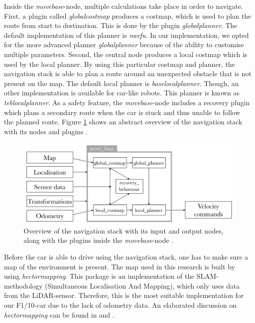 \documentclass[conference,a4paper]{IEEEtran}
\begin{document}
Inside the \textit{move\textunderscore base}-node, multiple calculations take place in order to navigate. First, a plugin called \emph{global\textunderscore costmap} produces a costmap, which is used to plan the route from start to destination. This is done by the plugin \emph{global\textunderscore planner}. The default implementation of this planner is \emph{navfn}. In our implementation, we opted for the more advanced planner \emph{global\textunderscore planner} because of the ability to customise multiple parameters. Second, the central node produces a local costmap which is used by the local planner. By using this particular costmap and planner, the navigation stack is able to plan a route around an unexpected obstacle that is not present on the map. The default local planner is \emph{base\textunderscore local\textunderscore planner}. Though, an other implementation is available for car-like robots. This planner is known as \emph{teb\textunderscore local\textunderscore planner}\cite{Rosmann2016}.  As a safety feature, the \emph{move\textunderscore base}-node includes a recovery plugin which plans a secondary route when the car is stuck and thus unable to follow the planned route.
Figure \ref{fig:navstack_global} shows an abstract overview of the navigation stack with its nodes and plugins \cite{Marder-Eppstein2016_2, Zheng2016}.
\begin{figure}[!t]
    \includegraphics[width=\columnwidth]{navstack3}
    \centering
    \caption{Overview of the navigation stack with its input and output nodes, along with the plugins inside the \emph{move\textunderscore base}-node \cite{Marder-Eppstein2016}.}
    \label{fig:navstack_global}
\end{figure}

Before the car is able to drive using the navigation stack, one has to make sure a map of the environment is present. The map used in this research is built by using \emph{hector\textunderscore mapping}. This package is an implementation of the SLAM-methodology (Simultaneous Localisation And Mapping), which only uses data from the LiDAR-sensor. Therefore, this is the most suitable implementation for our F1/10-car due to the lack of odometry data. An elaborated discussion on \emph{hector\textunderscore mapping} can be found in \cite{Kohlbrecher2011} and \cite{Kohlbrecher2012}. 
\end{document}
